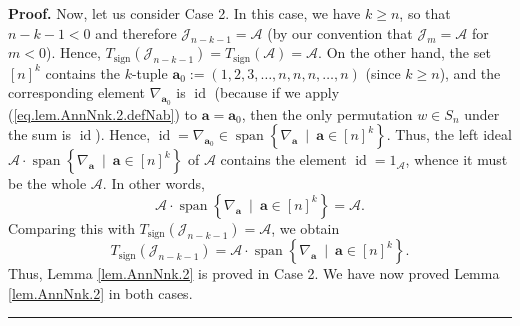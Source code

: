 \documentclass[numbers=enddot,12pt,final,onecolumn,notitlepage]{scrartcl}%
\numberwithin{exer}{subsection}
\theoremstyle{definition}
\newenvironment{proof}[1][Proof]{\noindent\textbf{#1.} }{\ \rule{0.5em}{0.5em}}
\begin{document}
\begin{proof}
Now, let us consider Case 2. In this case, we have $k\geq n$, so that
$n-k-1<0$ and therefore $\mathcal{J}_{n-k-1}=\mathcal{A}$ (by our convention
that $\mathcal{J}_{m}=\mathcal{A}$ for $m<0$). Hence, $T_{\operatorname*{sign}%
}\left(  \mathcal{J}_{n-k-1}\right)  =T_{\operatorname*{sign}}\left(
\mathcal{A}\right)  =\mathcal{A}$. On the other hand, the set $\left[
n\right]  ^{k}$ contains the $k$-tuple $\mathbf{a}_{0}:=\left(  1,2,3,\ldots
,n,n,n,\ldots,n\right)  $ (since $k\geq n$), and the corresponding element
$\nabla_{\mathbf{a}_{0}}$ is $\operatorname*{id}$ (because if we apply
(\ref{eq.lem.AnnNnk.2.defNab}) to $\mathbf{a}=\mathbf{a}_{0}$, then the only
permutation $w\in S_{n}$ under the sum is $\operatorname*{id}$). Hence,
$\operatorname*{id}=\nabla_{\mathbf{a}_{0}}\in\operatorname*{span}\left\{
\nabla_{\mathbf{a}}\ \mid\ \mathbf{a}\in\left[  n\right]  ^{k}\right\}  $.
Thus, the left ideal $\mathcal{A}\cdot\operatorname*{span}\left\{
\nabla_{\mathbf{a}}\ \mid\ \mathbf{a}\in\left[  n\right]  ^{k}\right\}  $ of
$\mathcal{A}$ contains the element $\operatorname*{id}=1_{\mathcal{A}}$,
whence it must be the whole $\mathcal{A}$. In other words,%
\[
\mathcal{A}\cdot\operatorname*{span}\left\{  \nabla_{\mathbf{a}}%
\ \mid\ \mathbf{a}\in\left[  n\right]  ^{k}\right\}  =\mathcal{A}.
\]
Comparing this with $T_{\operatorname*{sign}}\left(  \mathcal{J}%
_{n-k-1}\right)  =\mathcal{A}$, we obtain%
\[
T_{\operatorname*{sign}}\left(  \mathcal{J}_{n-k-1}\right)  =\mathcal{A}%
\cdot\operatorname*{span}\left\{  \nabla_{\mathbf{a}}\ \mid\ \mathbf{a}%
\in\left[  n\right]  ^{k}\right\}  .
\]
Thus, Lemma \ref{lem.AnnNnk.2} is proved in Case 2. We have now proved Lemma
\ref{lem.AnnNnk.2} in both cases.
\end{proof}
\end{document}
